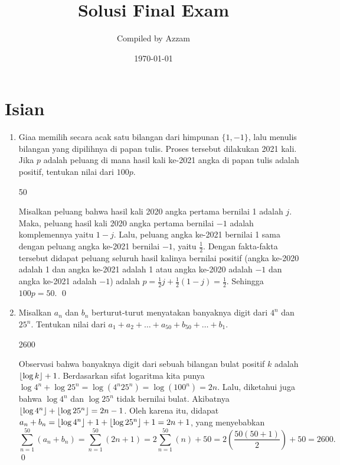 \documentclass[11pt]{scrartcl}
\title{Solusi Final Exam}
\author{Compiled by Azzam}
\date{\today}
\begin{document}
\maketitle

\section{Isian}
\begin{enumerate}[resume]
    \item Giaa memilih secara acak satu bilangan dari himpunan $\{1,-1\}$, lalu menulis bilangan yang dipilihnya di papan tulis. Proses tersebut dilakukan 2021 kali. Jika $p$ adalah peluang di mana hasil kali ke-2021 angka di papan tulis adalah positif, tentukan nilai dari $100p$.

    \begin{jawaban}
        50
    \end{jawaban}
    \begin{solusi}
        Misalkan peluang bahwa hasil kali 2020 angka pertama bernilai 1 adalah $j$. Maka, peluang hasil kali 2020 angka pertama bernilai $-1$ adalah komplemennya yaitu $1-j$. Lalu, peluang angka ke-2021 bernilai 1 sama dengan peluang angka ke-2021 bernilai $-1$, yaitu $\frac{1}{2}$. Dengan fakta-fakta tersebut didapat peluang seluruh hasil kalinya bernilai positif (angka ke-2020 adalah 1 dan angka ke-2021 adalah 1 atau angka ke-2020 adalah $-1$ dan angka ke-2021 adalah $-1$) adalah $p=\frac{1}{2}j+\frac{1}{2}(1-j) = \frac{1}{2}$. Sehingga $100p = 50$. \qed
    \end{solusi}
	
	
    \item Misalkan $a_n$ dan $b_n$ berturut-turut menyatakan banyaknya digit dari $4^n$ dan $25^n$. Tentukan nilai dari $a_1+a_2+\dots +a_{50}+b_{50}+\dots+b_1$.
    \begin{jawaban}
        2600
    \end{jawaban}
    \begin{solusi}
        Observasi bahwa banyaknya digit dari sebuah bilangan bulat positif $k$ adalah $\left\lfloor \log k \right\rfloor+1$. Berdasarkan sifat logaritma kita punya $\log 4^n + \log 25^n = \log (4^n25^n) = \log (100^n) = 2n$. Lalu, diketahui juga bahwa $\log 4^n$ dan $\log 25^n$ tidak bernilai bulat. Akibatnya $\left\lfloor \log 4^n \right\rfloor+\left\lfloor \log 25^n \right\rfloor = 2n-1$. Oleh karena itu, didapat $a_n+b_n =\left\lfloor \log 4^n \right\rfloor+1+\left\lfloor \log 25^n \right\rfloor+1= 2n+1$, yang menyebabkan $$\sum_{n=1}^{50}(a_n+b_n)=\sum_{n=1}^{50}(2n+1)=2\sum_{n=1}^{50}(n)+50=2\left(\frac{50(50+1)}{2}\right)+50=2600.$$ \qed
    \end{solusi}
	

\end{enumerate}
\end{document}
